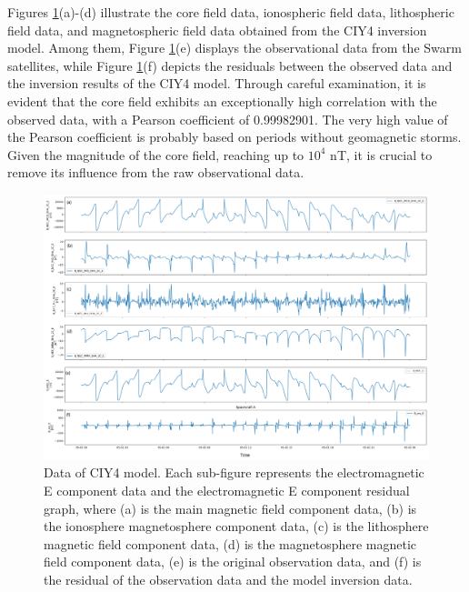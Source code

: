 \documentclass[3p,authoryear,preprint,12pt]{elsarticle}
\begin{document}
Figures \ref{fig:cyi4}(a)-(d) illustrate the core field data, ionospheric field data, lithospheric field data, and magnetospheric field data obtained from the CIY4 inversion model. Among them, Figure \ref{fig:cyi4}(e) displays the observational data from the Swarm satellites, while Figure \ref{fig:cyi4}(f) depicts the residuals between the observed data and the inversion results of the CIY4 model. Through careful examination, it is evident that the core field exhibits an exceptionally high correlation with the observed data, with a Pearson coefficient of 0.99982901. {The very high value of the Pearson coefficient is probably based on periods without geomagnetic storms.} Given the magnitude of the core field, reaching up to $10^4$ nT, it is crucial to remove its influence from the raw observational data.
\begin{figure}[htbp]
	\centering
	\includegraphics[width=1\linewidth]{CYI4Eng.png}
	\caption{Data of CIY4 model. {Each sub-figure represents the electromagnetic E component data and the electromagnetic E component residual graph, where (a) is the main magnetic field component data, (b) is the ionosphere magnetosphere component data, (c) is the lithosphere magnetic field component data, (d) is the magnetosphere magnetic field component data, (e) is the original observation data, and (f) is the residual of the observation data and the model inversion data.}}
	\label{fig:cyi4}
\end{figure}
%
\end{document}
